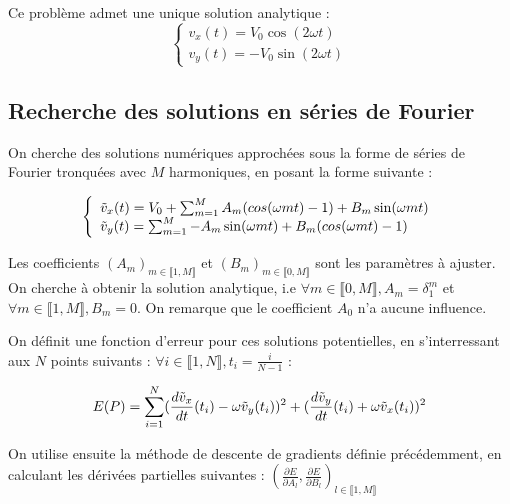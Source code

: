 \documentclass[]{article}
\begin{document}
Ce problème admet une unique solution analytique :
\begin{equation}
\left\{
    \begin{array}{ll}
        v_x(t) = V_0 \cos(2\omega t) \\
        v_y(t) = -V_0 \sin(2\omega t)
    \end{array}
\right.
\label{eq:solution analytique couplée}
\end{equation}

\subsection{Recherche des solutions en séries de Fourier}
On cherche des solutions numériques approchées sous la forme de séries de Fourier tronquées avec $M$ harmoniques, en posant la forme suivante :

\begin{equation}
\left\{
    \begin{array}{ll}
        \Tilde{v}_x(t) = V_0 + \sum_{m=1}^{M} A_m (cos(\omega m t)-1) + B_m \sin(\omega m t) \\
        \Tilde{v}_y(t) = \sum_{m=1}^{M} -A_m \sin(\omega m t) + B_m (cos(\omega m t)-1)
    \end{array}
\right.
\label{eq:solution Fourier couplée}
\end{equation}

Les coefficients $(A_m)_{m\in \llbracket 1,M \rrbracket}$ et $(B_m)_{m\in \llbracket 0,M \rrbracket}$ sont les paramètres à ajuster.
On cherche à obtenir la solution analytique, i.e $\forall m \in\llbracket 0,M \rrbracket, A_m = \delta _1 ^m $ et $\forall m \in\llbracket 1,M \rrbracket, B_m = 0 $. On remarque que le coefficient $A_0$ n'a aucune influence.

On définit une fonction d'erreur pour ces solutions potentielles, en s'interressant aux $N$ points suivants : $\forall i \in\llbracket 1,N \rrbracket, t_i = \frac{i}{N-1} $ :

\begin{equation}
        E(P) = \sum_{i=1}^{N} (\frac{d\Tilde{v}_x}{dt}(t_i) - \omega \Tilde{v}_y(t_i))^2 + (\frac{d\Tilde{v}_y}{dt}(t_i) + \omega \Tilde{v}_x(t_i))^2
\label{eq:erreur descente gradient couplées}
\end{equation}

On utilise ensuite la méthode de descente de gradients définie précédemment, en calculant les dérivées partielles suivantes :
$(\frac{\partial E}{\partial A_l}, \frac{\partial E}{\partial B_l})_{l \in \llbracket 1,M \rrbracket}$
\end{document}
